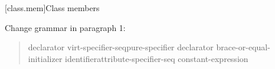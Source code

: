 \setcounter{chapter}{12}
\setcounter{section}{1}

[class.mem]{Class members}

Change grammar in paragraph 1:

\begin{quote}
\pnum
\begin{bnf}
\br
    declarator virt-specifier-seq\opt pure-specifier\opt\br
    \br
    declarator brace-or-equal-initializer\opt\br
    identifier\opt attribute-specifier-seq\opt \tcode{:} constant-expression
\end{bnf}
\end{quote}
